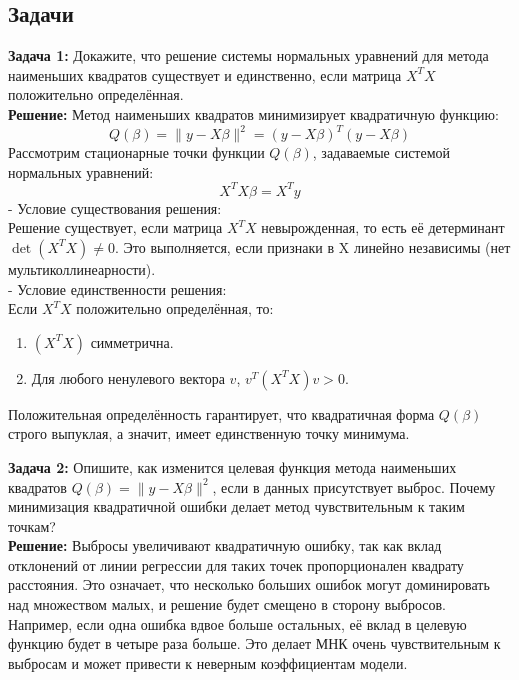 \subsection{Задачи}

\textbf{Задача 1:}
Докажите, что решение системы нормальных уравнений для метода наименьших квадратов существует и единственно, если матрица \(X^T X\) положительно определённая. \\
\textbf{Решение:}
Метод наименьших квадратов минимизирует квадратичную функцию:
\[
Q(\beta) = \|y - X\beta\|^2 = (y - X\beta)^T (y - X\beta)
\]
Рассмотрим стационарные точки функции \(Q(\beta)\), задаваемые системой нормальных уравнений:
\[
X^TX\beta = X^Ty
\]
- Условие существования решения: \\
Решение существует, если матрица \(X^T X\) невырожденная, то есть её детерминант \(\det(X^T X) \neq 0\). Это выполняется, если признаки в X линейно независимы (нет мультиколлинеарности). \\
- Условие единственности решения: \\
Если \(X^T X\) положительно определённая, то:
\begin{enumerate}
	\item \((X^T X)\) симметрична.
	\item Для любого ненулевого вектора \(v\), \(v^T(X^T X)v > 0\).
\end{enumerate}
Положительная определённость гарантирует, что квадратичная форма \(Q(\beta)\) строго выпуклая, а значит, имеет единственную точку минимума.

\textbf{Задача 2:}
Опишите, как изменится целевая функция метода наименьших квадратов \( Q(\beta) = \|y - X\beta\|^2 \), если в данных присутствует выброс. Почему минимизация квадратичной ошибки делает метод чувствительным к таким точкам? \\
\textbf{Решение:}
Выбросы увеличивают квадратичную ошибку, так как вклад отклонений от линии регрессии для таких точек пропорционален квадрату расстояния. Это означает, что несколько больших ошибок могут доминировать над множеством малых, и решение будет смещено в сторону выбросов. Например, если одна ошибка вдвое больше остальных, её вклад в целевую функцию будет в четыре раза больше. Это делает МНК очень чувствительным к выбросам и может привести к неверным коэффициентам модели.

